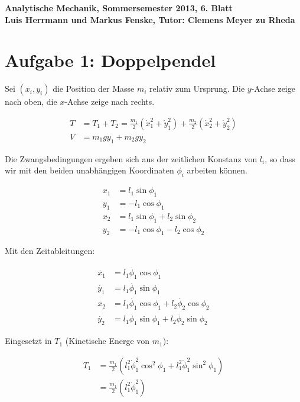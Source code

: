 \documentclass[a4paper,german,12pt,smallheadings]{scrartcl}
\begin{document}
\begin{center}
\bfseries %
\sffamily %
\vspace{-40pt}
Analytische Mechanik, Sommersemester 2013, 6. Blatt \\
Luis Herrmann und Markus Fenske, Tutor: Clemens Meyer zu Rheda
\vspace{-10pt}
\end{center}
\section*{Aufgabe 1: Doppelpendel}

Sei $(x_i, y_i)$ die Position der Masse $m_i$ relativ zum Ursprung. Die
$y$-Achse zeige nach oben, die $x$-Achse zeige nach rechts.

\begin{align*}
  T &= T_1 + T_2 = \frac{m_1}{2} (\dot{x}_1^2 + \dot{y}_1^2) + \frac{m_2}{2} (\dot{x}_2^2 + \dot{y}_2^2) \\
  V &= m_1gy_1 + m_2gy_2
\end{align*}

Die Zwangsbedingungen ergeben sich aus der zeitlichen Konstanz von $l_i$, so
dass wir mit den beiden unabhängigen Koordinaten $\phi_i$ arbeiten können.

\begin{align*}
  x_1 &=  l_1 \sin \phi_1 \\
  y_1 &= -l_1 \cos \phi_1 \\
  x_2 &=  l_1 \sin \phi_1 + l_2 \sin \phi_2 \\
  y_2 &= -l_1 \cos \phi_1 - l_2 \cos \phi_2
\end{align*}

Mit den Zeitableitungen:

\begin{align*}
  \dot{x_1} &= l_1 \dot{\phi_1} \cos \phi_1 \\
  \dot{y_1} &= l_1 \dot{\phi_1} \sin \phi_1 \\
  \dot{x_2} &= l_1 \dot{\phi_1} \cos \phi_1 + l_2 \dot{\phi_2} \cos \phi_2\\
  \dot{y_2} &= l_1 \dot{\phi_1} \sin \phi_1 + l_2 \dot{\phi_2} \sin \phi_2
\end{align*}

Eingesetzt in $T_1$ (Kinetische Energe von $m_1$):

\begin{align*}
  T_1 &= \frac{m_1}{2} (l_1^2 \dot{\phi}_1^2 \cos^2 \phi_1 + l_1^2 \dot{\phi}_1^2 \sin^2 \phi_1) \\
    &= \frac{m_1}{2} (l_1^2 \dot{\phi}_1^2)
\end{align*}
\end{document}
